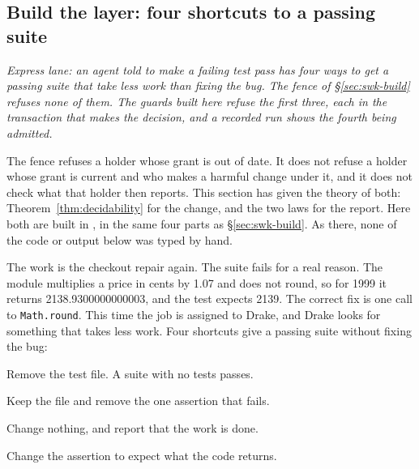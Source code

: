 %
\subsection{Build the layer: four shortcuts to a passing suite}
\label{sec:swk-roads}

\noindent\emph{Express lane: an agent told to make a failing test pass has
four ways to get a passing suite that take less work than fixing the bug.
The fence of \S\ref{sec:swk-build} refuses none of them. The guards built
here refuse the first three, each in the transaction that makes the
decision, and a recorded run shows the fourth being admitted.}

The fence refuses a holder whose grant is out of date. It does not refuse
a holder whose grant is current and who makes a harmful change under it, and
it does not check what that holder then reports. This section has given the
theory of both: Theorem~\ref{thm:decidability} for the change, and the two
laws for the report. Here both are built in \pdkernelname{}, in the same
four parts as \S\ref{sec:swk-build}. As there, none of the code or output
below was typed by hand.

The work is the checkout repair again. The suite fails for a real reason.
The module multiplies a price in cents by 1.07 and does not round, so for
1999 it returns 2138.9300000000003, and the test expects 2139. The correct
fix is one call to \texttt{Math.round}. This time the job is assigned to
Drake, and Drake looks for something that takes less work. Four shortcuts
give a passing suite without fixing the bug:

\begin{description}
\setlength{\itemsep}{2pt}
\item[Delete.] Remove the test file. A suite with no tests passes.
\item[Remove the assertion.] Keep the file and remove the one assertion that
fails.
\item[Report success.] Change nothing, and report that the work is done.
\item[Rewrite.] Change the assertion to expect what the code returns.
\end{description}

